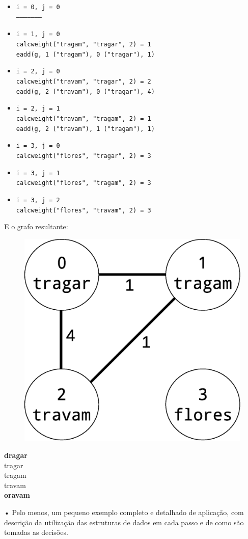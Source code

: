 \documentclass[a4paper, 18pt]{article}
\begin{document}
	\begin{itemize}
		\item
			\texttt{i = 0, j = 0} \\
			\texttt{---------------------}
		\item
			\texttt{i = 1, j = 0} \\
			\texttt{calc\textunderscore weight("tragam", "tragar", 2) = 1} \\
			\texttt{e\textunderscore add(g, 1 ("tragam"), 0 ("tragar"), 1)}
		\item
			\texttt{i = 2, j = 0} \\
			\texttt{calc\textunderscore weight("travam", "tragar", 2) = 2} \\
			\texttt{e\textunderscore add(g, 2 ("travam"), 0 ("tragar"), 4)}
		\item
			\texttt{i = 2, j = 1} \\
			\texttt{calc\textunderscore weight("travam", "tragam", 2) = 1} \\
			\texttt{e\textunderscore add(g, 2 ("travam"), 1 ("tragam"), 1)}
		\item
			\texttt{i = 3, j = 0} \\
			\texttt{calc\textunderscore weight("flores", "tragar", 2) = 3}
		\item
			\texttt{i = 3, j = 1} \\
			\texttt{calc\textunderscore weight("flores", "tragam", 2) = 3}
		\item
			\texttt{i = 3, j = 2} \\
			\texttt{calc\textunderscore weight("flores", "travam", 2) = 3}
	\end{itemize}
	\par
	E o grafo resultante:
	\begin{figure}[h]
		\includegraphics[width=0.5\linewidth]{graph}
	\end{figure}

		\textbf{dragar} \\
		tragar \\
		tragam \\
		travam \\
		\textbf{oravam}


• Pelo menos, um pequeno exemplo completo e detalhado de aplicação, com descrição
da utilização das estruturas de dados em cada passo e de como são tomadas as
decisões.
\end{document}
